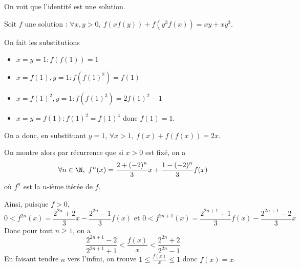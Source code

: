 On voit que l'identité est une solution.

Soit $f$ une solution : $\forall x, y > 0,~f(xf(y)) + f(y^3f(x)) = xy + xy^3$.

On fait les substitutions
\begin{itemize}
\item $x = y = 1 : f(f(1)) = 1$
\item $x = f(1), y = 1 : f(f(1)^2) = f(1)$
\item $x = f(1)^2, y = 1 : f(f(1)^3) = 2f(1)^2 - 1$
\item $x = y = f(1) : f(1)^2 = f(1)^4$ donc $f(1) = 1$.
\end{itemize}

On a donc, en substituant $y = 1$, $\forall x > 1, ~f(x) + f(f(x)) = 2x$.

On montre alors par récurrence que si $x > 0$ est fixé, on a
$$\forall n\in\N,~f^n(x) = \frac{2 + (-2)^n}3 x + \frac{1 - (-2)^n}3 f(x)$$
où $f^n$ est la $n$-ième itérée de $f$.
\medskip

Ainsi, puisque $f > 0$,
$$0 < f^{2n}(x) = \frac{2^{2n} + 2}3 x - \frac{2^{2n} - 1}3 f(x) \text{ et } 0 < f^{2n + 1}(x) = \frac{2^{2n + 1} + 1}3 f(x) - \frac{2^{2n + 1} - 2}3 x$$
Donc pour tout $n \ge 1$, on a
$$\frac{2^{2n + 1}-2}{2^{2n + 1} + 1} < \frac{f(x)}x < \frac{2^{2n} + 2}{2^{2n} - 1}$$
En faisant tendre $n$ vers l'infini, on trouve $1 \le \frac{f(x)}x \le 1$ donc $f(x) = x$.
